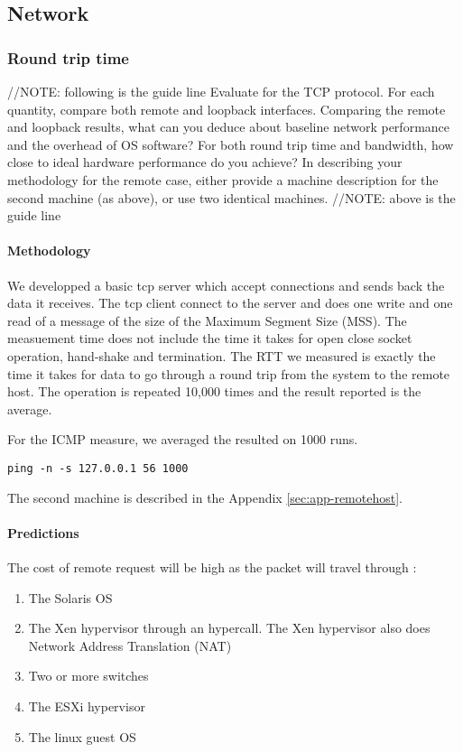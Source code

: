 \subsection{Network}

\subsubsection{Round trip time}

//NOTE: following is the guide line
Evaluate for the TCP protocol. For each quantity, compare both remote and loopback interfaces. Comparing the remote and loopback results, what can you deduce about baseline network performance and the overhead of OS software? For both round trip time and bandwidth, how close to ideal hardware performance do you achieve? In describing your methodology for the remote case, either provide a machine description for the second machine (as above), or use two identical machines.
//NOTE: above is the guide line

\paragraph{Methodology}
We developped a basic tcp server which accept connections and sends back the
data it receives.
The tcp client connect to the server and does one write and one read of a message of
the size of the Maximum Segment Size (MSS). The measuement time does not include the time it takes for open close socket operation, hand-shake and termination. The RTT we measured is exactly the time it takes for data to go through a round trip from the system to the remote host.
The operation is repeated 10,000 times and the result reported is the average.

For the ICMP measure, we averaged the resulted on 1000 runs.
\begin{verbatim}
ping -n -s 127.0.0.1 56 1000
\end{verbatim}

The second machine is described in the Appendix \ref{sec:app-remotehost}.

\paragraph{Predictions}
The cost of remote request will be high as the packet will travel through :
\begin{enumerate}
\item The Solaris OS
\item The Xen hypervisor through an hypercall.
The Xen hypervisor also does Network Address Translation (NAT)
\item Two or more switches
\item The ESXi hypervisor
\item The linux guest OS
\end{enumerate}

